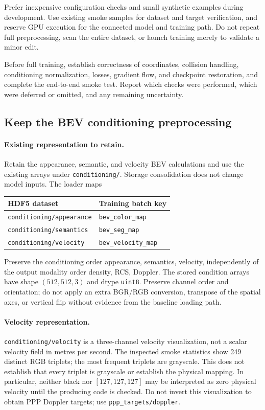 \documentclass[11pt,a4paper]{article}
\begin{document}
Prefer inexpensive configuration checks and small synthetic
examples during development. Use existing smoke samples for
dataset and target verification, and reserve GPU execution for
the connected model and training path. Do not repeat full
preprocessing, scan the entire dataset, or launch training
merely to validate a minor edit.

Before full training, establish correctness of coordinates,
collision handling, conditioning normalization, losses,
gradient flow, and checkpoint restoration, and complete the
end-to-end smoke test. Report which checks were performed,
which were deferred or omitted, and any remaining uncertainty.

\subsection{Keep the BEV conditioning preprocessing}

\paragraph{Existing representation to retain.}
Retain the appearance, semantic, and velocity BEV calculations and use the existing arrays under \texttt{conditioning/}. Storage consolidation does not change model inputs. The loader maps
\begin{center}
\begin{tabular}{ll}
\hline
HDF5 dataset & Training batch key \\
\hline
\texttt{conditioning/appearance} & \texttt{bev\_color\_map} \\
\texttt{conditioning/semantics} & \texttt{bev\_seg\_map} \\
\texttt{conditioning/velocity} & \texttt{bev\_velocity\_map} \\
\hline
\end{tabular}
\end{center}
Preserve the conditioning order appearance, semantics, velocity, independently of the output modality order density, RCS, Doppler. The stored condition arrays have shape \((512,512,3)\) and dtype \texttt{uint8}. Preserve channel order and orientation; do not apply an extra BGR/RGB conversion, transpose of the spatial axes, or vertical flip without evidence from the baseline loading path.

\paragraph{Velocity representation.}
\texttt{conditioning/velocity} is a three-channel velocity visualization, not a scalar velocity field in metres per second. The inspected smoke statistics show 249 distinct RGB triplets; the most frequent triplets are grayscale. This does not establish that every triplet is grayscale or establish the physical mapping. In particular, neither black nor \([127,127,127]\) may be interpreted as zero physical velocity until the producing code is checked. Do not invert this visualization to obtain PPP Doppler targets; use \texttt{ppp\_targets/doppler}.
\end{document}
